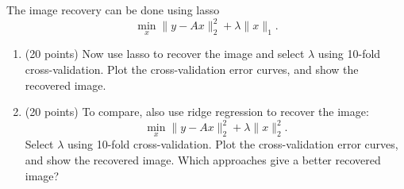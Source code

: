 \documentclass[twoside,10pt]{article}
\begin{document}
\begin{enumerate}
The image recovery can be done using lasso
\[
\min_x \|y-Ax\|_2^2 + \lambda \|x\|_1.
\]
\begin{enumerate}
\item (20 points) Now use lasso to recover the image and select $\lambda$ using 10-fold cross-validation. Plot the cross-validation error curves, and show the recovered image. 
\item (20 points) To compare, also use ridge regression to recover the image:
\[
\min_x \|y-Ax\|_2^2 + \lambda \|x\|_2^2.
\]
Select $\lambda$ using 10-fold cross-validation. Plot the cross-validation error curves, and show the recovered image. Which approaches give a better recovered image?
\end{enumerate}


\end{enumerate}
\end{document}
